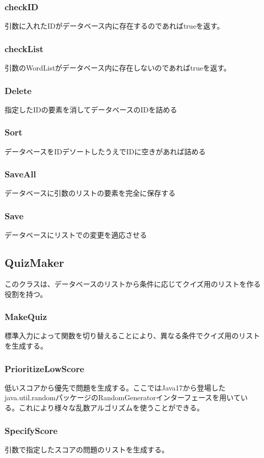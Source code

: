 \documentclass{ltjsarticle}
\begin{document}
\subsubsection{checkID}
引数に入れたIDがデータベース内に存在するのであればtrueを返す。
\subsubsection{checkList}
引数のWordListがデータベース内に存在しないのであればtrueを返す。
\subsubsection{Delete}
指定したIDの要素を消してデータベースのIDを詰める
\subsubsection{Sort}
データベースをIDデソートしたうえでIDに空きがあれば詰める
\subsubsection{SaveAll}
データベースに引数のリストの要素を完全に保存する
\subsubsection{Save}
データベースにリストでの変更を適応させる

\subsection{QuizMaker}
このクラスは、データベースのリストから条件に応じてクイズ用のリストを作る役割を持つ。
\subsubsection{MakeQuiz}
標準入力によって関数を切り替えることにより、異なる条件でクイズ用のリストを生成する。
\subsubsection{PrioritizeLowScore}
低いスコアから優先で問題を生成する。ここではJava17から登場したjava.util.randomパッケージのRandomGeneratorインターフェースを用いている。これにより様々な乱数アルゴリズムを使うことができる。
\subsubsection{SpecifyScore}
引数で指定したスコアの問題のリストを生成する。
\end{document}
